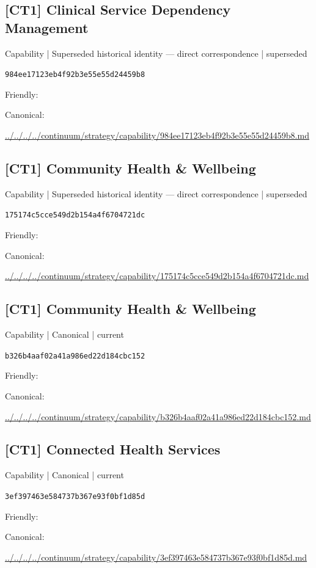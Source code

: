 \documentclass[10pt,a4paper]{article}
\begin{document}
\subsection*{[CT1] Clinical Service Dependency Management}
{\small Capability | Superseded historical identity — direct correspondence | superseded}\par
\texttt{984ee17123eb4f92b3e55e55d24459b8}\par
Friendly: \par
Canonical: \par
{\footnotesize\url{../../../../continuum/strategy/capability/984ee17123eb4f92b3e55e55d24459b8.md}}\par
\subsection*{[CT1] Community Health \& Wellbeing}
{\small Capability | Superseded historical identity — direct correspondence | superseded}\par
\texttt{175174c5cce549d2b154a4f6704721dc}\par
Friendly: \par
Canonical: \par
{\footnotesize\url{../../../../continuum/strategy/capability/175174c5cce549d2b154a4f6704721dc.md}}\par
\subsection*{[CT1] Community Health \& Wellbeing}
{\small Capability | Canonical | current}\par
\texttt{b326b4aaf02a41a986ed22d184cbc152}\par
Friendly: \par
Canonical: \par
{\footnotesize\url{../../../../continuum/strategy/capability/b326b4aaf02a41a986ed22d184cbc152.md}}\par
\subsection*{[CT1] Connected Health Services}
{\small Capability | Canonical | current}\par
\texttt{3ef397463e584737b367e93f0bf1d85d}\par
Friendly: \par
Canonical: \par
{\footnotesize\url{../../../../continuum/strategy/capability/3ef397463e584737b367e93f0bf1d85d.md}}\par
\end{document}
